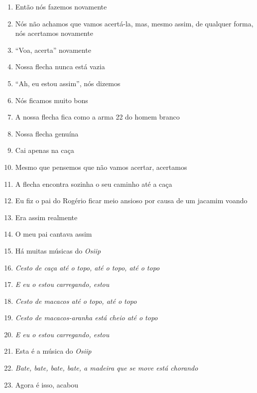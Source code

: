 \begin{enumerate}
 \begin{center}\end{center}
 
 \item Então nós fazemos novamente
 \item Nós não achamos que vamos acertá-la, mas, mesmo assim, de qualquer
 forma, nós acertamos novamente
 \item ``Voa, acerta'' novamente
 \item Nossa flecha nunca está vazia
 
 \begin{center}\end{center}
 
 \item ``Ah, eu estou assim'', nós dizemos
 \item Nós ficamos muito bons
 \item A nossa flecha fica como a arma 22 do homem branco
 \item Nossa flecha genuína
 \item Cai apenas na caça
 \item Mesmo que pensemos que não vamos acertar, acertamos
 \item A flecha encontra sozinha o seu caminho até a caça
 \item Eu fiz o pai do Rogério ficar meio ansioso por causa de um jacamim
 voando
 \item Era assim realmente
 
 \begin{center}\end{center}
 
 \item O meu pai cantava assim
 \item Há muitas músicas do \textit{Osiip}
 \item\textit{Cesto de caça até o topo, até o topo, até o topo}
 \item\textit{E eu o estou carregando, estou }
 \item\textit{Cesto de macacos até o topo, até o topo}
 \item\textit{Cesto de macacos-aranha está cheio até o topo}
 \item\textit{E eu o estou carregando, estou}
 \item Esta é a música do \textit{Osiip}
 \item\textit{Bate, bate, bate, bate, a madeira que se move está chorando}
 \item Agora é isso, acabou
 

\end{enumerate}

